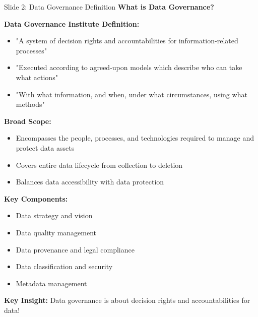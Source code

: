 \documentclass[8pt]{beamer}
\begin{document}
	\begin{frame}{Slide 2: Data Governance Definition}
		\fontsize{6.5}{7.5}\selectfont
		\textbf{What is Data Governance?}
		
		\vspace{0.1cm}
		\textbf{Data Governance Institute Definition:}
		\begin{itemize}
			\item "A system of decision rights and accountabilities for information-related processes"
			\item "Executed according to agreed-upon models which describe who can take what actions"
			\item "With what information, and when, under what circumstances, using what methods"
		\end{itemize}
		
		\vspace{0.1cm}
		\textbf{Broad Scope:}
		\begin{itemize}
			\item Encompasses the people, processes, and technologies required to manage and protect data assets
			\item Covers entire data lifecycle from collection to deletion
			\item Balances data accessibility with data protection
		\end{itemize}
		
		\vspace{0.1cm}
		\textbf{Key Components:}
		\begin{itemize}
			\item Data strategy and vision
			\item Data quality management
			\item Data provenance and legal compliance
			\item Data classification and security
			\item Metadata management
		\end{itemize}
		
		\textcolor{myblue}{\textbf{Key Insight:}} Data governance is about \textcolor{myblue}{decision rights and accountabilities} for data!
	\end{frame}
	
\end{document}
